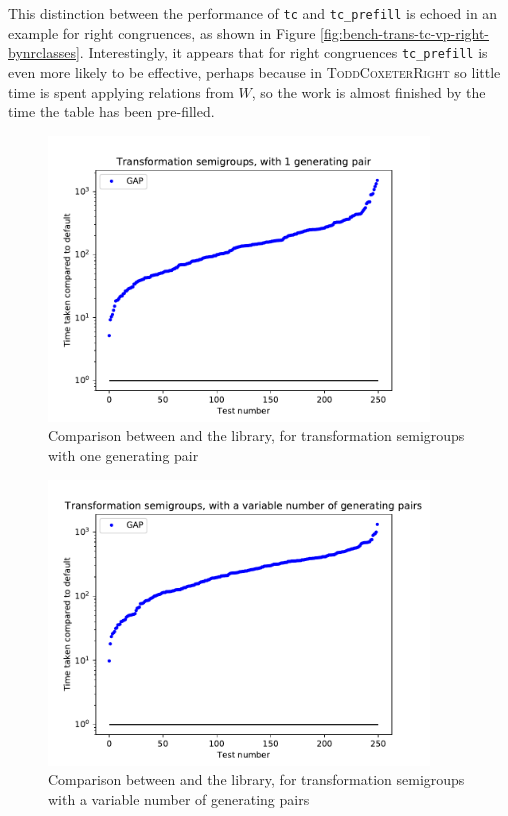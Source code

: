 This distinction between the performance of \texttt{tc} and \texttt{tc\_prefill}
is echoed in an example for right congruences, as shown in Figure
\ref{fig:bench-trans-tc-vp-right-bynrclasses}.  Interestingly, it appears that
for right congruences \texttt{tc\_prefill} is even more likely to be effective,
perhaps because in \textsc{ToddCoxeterRight} so little time is spent applying
relations from $W$, so the work is almost finished by the time the table has
been pre-filled.

\begin{figure}[p]
  \centering
  \includegraphics[width=0.9\textwidth]{pics/ch-pairs/bench-trans-1p-gap}
  \caption[Benchmark: \GAP{}/\libsemigroups{}, concrete, 1 pair]
  {Comparison between \libsemigroups{} and the \GAP{} library, for
    transformation semigroups with one generating pair}
  \label{fig:bench-trans-1p-gap}
\end{figure}

\begin{figure}[p]
  \centering
  \includegraphics[width=0.9\textwidth]{pics/ch-pairs/bench-trans-vp-gap}
  \caption[Benchmark: \GAP{}/\libsemigroups{}, concrete, $n$ pairs]
  {Comparison between \libsemigroups{} and the \GAP{} library, for
    transformation semigroups with a variable number of generating pairs}
  \label{fig:bench-trans-vp-gap}
\end{figure}

